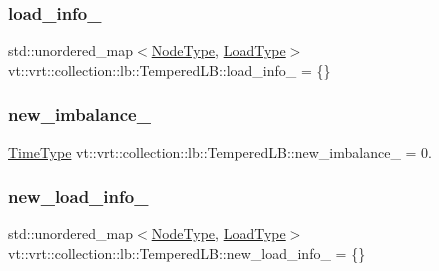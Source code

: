 \subsubsection{\texorpdfstring{load\+\_\+info\+\_\+}{load\_info\_}}
{\footnotesize\ttfamily std\+::unordered\+\_\+map$<$\hyperlink{namespacevt_a866da9d0efc19c0a1ce79e9e492f47e2}{Node\+Type}, \hyperlink{structvt_1_1vrt_1_1collection_1_1lb_1_1_base_l_b_a215e22b9f12678303f49615ae3be05cc}{Load\+Type}$>$ vt\+::vrt\+::collection\+::lb\+::\+Tempered\+L\+B\+::load\+\_\+info\+\_\+ = \{\}\hspace{0.3cm}{\ttfamily [private]}}

\mbox{\label{structvt_1_1vrt_1_1collection_1_1lb_1_1_tempered_l_b_a3ac4a348162582ab0b2dc0275cf243a9}} 
\subsubsection{\texorpdfstring{new\+\_\+imbalance\+\_\+}{new\_imbalance\_}}
{\footnotesize\ttfamily \hyperlink{namespacevt_a876a9d0cd5a952859c72de8a46881442}{Time\+Type} vt\+::vrt\+::collection\+::lb\+::\+Tempered\+L\+B\+::new\+\_\+imbalance\+\_\+ = 0.\hspace{0.3cm}{\ttfamily [private]}}

\mbox{\label{structvt_1_1vrt_1_1collection_1_1lb_1_1_tempered_l_b_a117b1bb212ced62335f93bfbc825ca9d}} 
\subsubsection{\texorpdfstring{new\+\_\+load\+\_\+info\+\_\+}{new\_load\_info\_}}
{\footnotesize\ttfamily std\+::unordered\+\_\+map$<$\hyperlink{namespacevt_a866da9d0efc19c0a1ce79e9e492f47e2}{Node\+Type}, \hyperlink{structvt_1_1vrt_1_1collection_1_1lb_1_1_base_l_b_a215e22b9f12678303f49615ae3be05cc}{Load\+Type}$>$ vt\+::vrt\+::collection\+::lb\+::\+Tempered\+L\+B\+::new\+\_\+load\+\_\+info\+\_\+ = \{\}\hspace{0.3cm}{\ttfamily [private]}}

